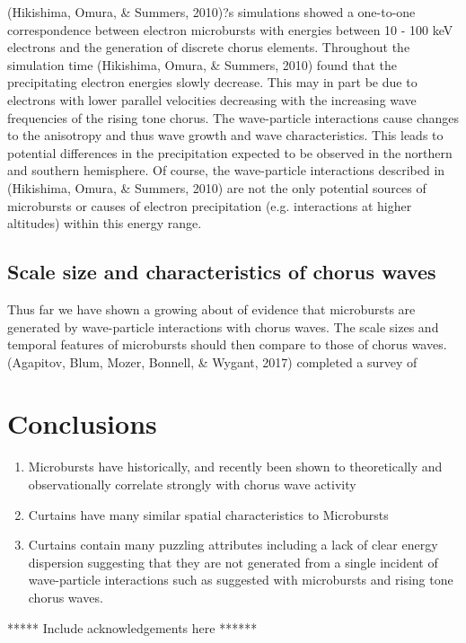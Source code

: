 \documentclass[referee,a4paper,12pt,traditabstract]{swsc}
\begin{document}
\begin{linenumbers}
(Hikishima, Omura, \& Summers, 2010)?s simulations showed a one-to-one correspondence between electron microbursts with energies between 10 - 100 keV electrons and the generation of discrete chorus elements. Throughout the simulation time (Hikishima, Omura, \& Summers, 2010) found that the precipitating electron energies slowly decrease. This may in part be due to electrons with lower parallel velocities decreasing with the increasing wave frequencies of the rising tone chorus. The wave-particle interactions cause changes to the anisotropy and thus wave growth and wave characteristics. This leads to potential differences in the precipitation expected to be observed in the northern and southern hemisphere. Of course, the wave-particle interactions described in (Hikishima, Omura, \& Summers, 2010) are not the only potential sources of microbursts or causes of electron precipitation (e.g. interactions at higher altitudes) within this energy range. 



\subsection{Scale size and characteristics of chorus waves}

Thus far we have shown a growing about of evidence that microbursts are generated by wave-particle interactions with chorus waves. The scale sizes and temporal features of microbursts should then compare to those of chorus waves. (Agapitov, Blum, Mozer, Bonnell, \& Wygant, 2017) completed a survey of 

\section{Conclusions}

   \begin{enumerate}
      \item Microbursts have historically, and recently been shown to theoretically and observationally correlate strongly with chorus wave activity
      \item Curtains have many similar spatial characteristics to Microbursts
      \item Curtains contain many puzzling attributes including a lack of clear energy dispersion suggesting that they are not generated from a single incident of wave-particle interactions such as suggested with microbursts and rising tone chorus waves. 
   \end{enumerate}

\begin{acknowledgements}
***** Include acknowledgements here ****** 
\end{acknowledgements}



   
\end{linenumbers}
\end{document}
